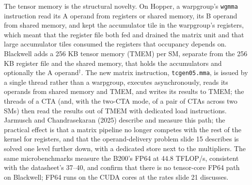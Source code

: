 \documentclass[11pt,letterpaper]{article}
\begin{document}
The tensor memory is the structural novelty. On Hopper, a warpgroup's \texttt{wgmma} instruction read its A operand from registers or shared memory, its B operand from shared memory, and kept the accumulator tile in the warpgroup's registers, which meant that the register file both fed and drained the matrix unit and that large accumulator tiles consumed the registers that occupancy depends on. Blackwell adds a 256 KB tensor memory (TMEM) per SM, separate from the 256 KB register file and the shared memory, that holds the accumulators and optionally the A operand$^\dagger$. The new matrix instruction, \texttt{tcgen05.mma}, is issued by a single thread rather than a warpgroup, executes asynchronously, reads its operands from shared memory and TMEM, and writes its results to TMEM; the threads of a CTA (and, with the two-CTA mode, of a pair of CTAs across two SMs) then read the results out of TMEM with dedicated load instructions. Jarmusch and Chandrasekaran (2025) describe and measure this path; the practical effect is that a matrix pipeline no longer competes with the rest of the kernel for registers, and that the operand-delivery problem slide 15 describes is solved one level further down, with a dedicated store next to the multipliers. The same microbenchmarks measure the B200's FP64 at 44.8 TFLOP/s, consistent with the datasheet's 37--40, and confirm that there is no tensor-core FP64 path on Blackwell; FP64 runs on the CUDA cores at the rates slide 21 discusses.
\end{document}
